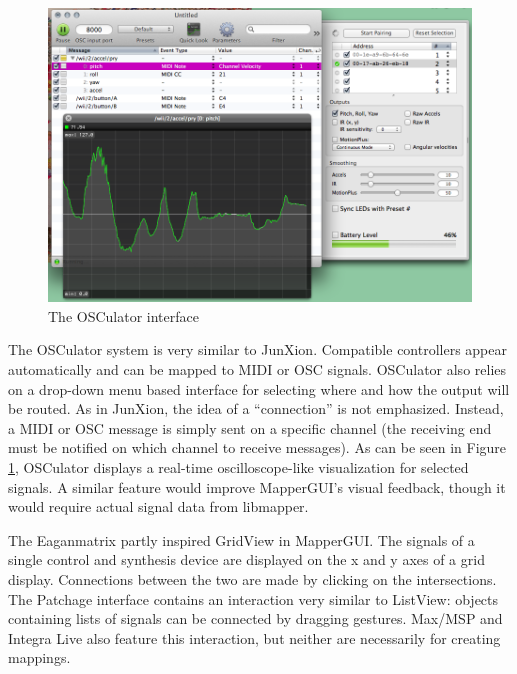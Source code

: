 \begin{figure}[h]
	\centering
		\includegraphics[width=\textwidth]{figures/osculator}
		\caption{The OSCulator interface}
		\label{fig:osculator}
\end{figure}

The OSCulator system \cite{osculator} is very similar to JunXion. Compatible controllers appear automatically and can be mapped to MIDI or OSC signals. OSCulator also relies on a drop-down menu based interface for selecting where and how the output will be routed. As in JunXion, the idea of a ``connection'' is not emphasized. Instead, a MIDI or OSC message is simply sent on a specific channel (the receiving end must be notified on which channel to receive messages). As can be seen in Figure \ref{fig:osculator}, OSCulator displays a real-time oscilloscope-like visualization for selected signals. A similar feature would improve MapperGUI's visual feedback, though it would require actual signal data from libmapper.

The Eaganmatrix \cite{eaganmatrix} partly inspired GridView in MapperGUI. The signals of a single control and synthesis device are displayed on the x and y axes of a grid display. Connections between the two are made by clicking on the intersections. The Patchage interface \cite{patchage} contains an interaction very similar to ListView: objects containing lists of signals can be connected by dragging gestures. Max/MSP and Integra Live \cite{integra} also feature this interaction, but neither are necessarily for creating mappings. 




